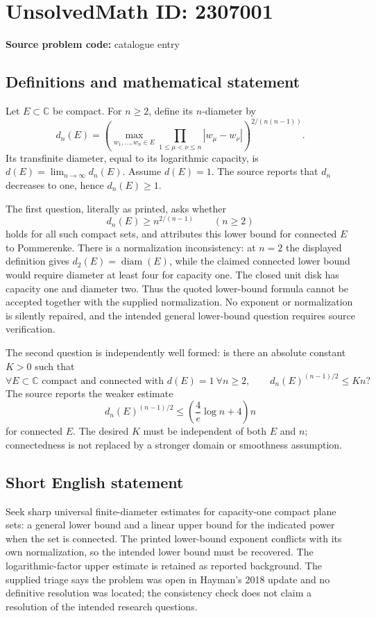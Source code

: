 \documentclass[11pt]{article}
\newcommand{\C}{\mathbb{C}}
\begin{document}
\section*{UnsolvedMath ID: 2307001}
\textbf{Source problem code:} catalogue entry
\subsection{Definitions and mathematical statement}
Let $E\subset\C$ be compact. For $n\geq2$, define its $n$-diameter by
\[
 d_n(E)=\left(\max_{w_1,\ldots,w_n\in E}
             \prod_{1\leq\mu<\nu\leq n}|w_\mu-w_\nu|\right)^{2/(n(n-1))}.
\]
Its transfinite diameter, equal to its logarithmic capacity, is $d(E)=\lim_{n\to\infty}d_n(E)$. Assume $d(E)=1$. The source reports that $d_n$ decreases to one, hence $d_n(E)\geq1$.

The first question, literally as printed, asks whether
\[
 d_n(E)\geq n^{2/(n-1)}\qquad(n\geq2)
\]
holds for all such compact sets, and attributes this lower bound for connected $E$ to Pommerenke. There is a normalization inconsistency: at $n=2$ the displayed definition gives $d_2(E)=\operatorname{diam}(E)$, while the claimed connected lower bound would require diameter at least four for capacity one. The closed unit disk has capacity one and diameter two. Thus the quoted lower-bound formula cannot be accepted together with the supplied normalization. No exponent or normalization is silently repaired, and the intended general lower-bound question requires source verification.

The second question is independently well formed: is there an absolute constant $K>0$ such that
\[
 \forall E\subset\C\text{ compact and connected with }d(E)=1\ \forall n\geq2,
 \qquad d_n(E)^{(n-1)/2}\leq Kn?
\]
The source reports the weaker estimate
\[
 d_n(E)^{(n-1)/2}\leq\left(\frac4e\log n+4\right)n
\]
for connected $E$. The desired $K$ must be independent of both $E$ and $n$; connectedness is not replaced by a stronger domain or smoothness assumption.
\subsection{Short English statement}
Seek sharp universal finite-diameter estimates for capacity-one compact plane sets: a general lower bound and a linear upper bound for the indicated power when the set is connected. The printed lower-bound exponent conflicts with its own normalization, so the intended lower bound must be recovered. The logarithmic-factor upper estimate is retained as reported background. The supplied triage says the problem was open in Hayman's 2018 update and no definitive resolution was located; the consistency check does not claim a resolution of the intended research questions.
\end{document}
